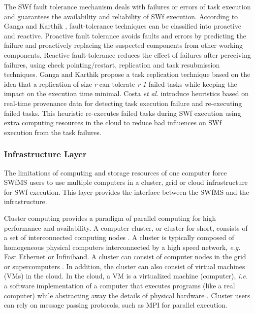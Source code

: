 The SWf fault tolerance mechanism deals with failures or errors of task execution and guarantees the availability and reliability of SWf execution. 
According to Ganga and Karthik \cite{Ganga2013}, fault-tolerance techniques can be classified into proactive and reactive.
Proactive fault tolerance avoids faults and errors
by predicting the failure and proactively replacing the suspected
components from other working components. Reactive
fault-tolerance reduces the effect of failures after perceiving
failures, using check pointing/restart, replication
and task resubmission techniques.
Ganga and Karthik \cite{Ganga2013}
propose a task replication technique based on the idea that a replication
of size \textit{r} can tolerate \textit{r-1} failed tasks while keeping
the impact on the execution time minimal. Costa \textit{et al.} \cite{Costa2012}
introduce heuristics based on real-time provenance data for
detecting task execution failure and re-executing failed tasks. This
heuristic re-executes failed tasks during SWf execution using
extra computing resources in the cloud to reduce bad influences on
SWf execution from the task failures.

\subsubsection{Infrastructure Layer}
\label{sec:subsub:IL}

The limitations of computing and storage resources
of one computer force SWfMS users to use multiple computers in a cluster, grid or cloud infrastructure for SWf execution. This layer provides the interface between the SWfMS and the infrastructure.

Cluster computing provides a paradigm of parallel computing for high performance and availability. A computer cluster, or cluster for short, consists of a set of interconnected computing nodes \cite{Chowdhury2011}. A cluster is typically composed of homogeneous physical computers interconnected by a high speed network, \textit{e.g.} Fast Ethernet or Infiniband.
A cluster can consist of computer nodes in the grid or supercomputers \cite{Critchlow2011}. In addition, the cluster can also consist of virtual machines (VMs) in the cloud. In the cloud, a VM is a virtualized machine (computer), \textit{i.e.} a software implementation of a computer that executes programs (like a real computer) while abstracting away the details of physical hardware \cite{Zhang2010}. Cluster users can rely on message
passing protocols, such as MPI for parallel execution.


